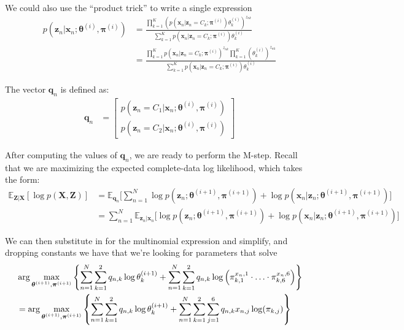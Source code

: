 \documentclass[12pt,letterpaper]{article}
\begin{document}
We could also use the ``product trick'' to write a single expression
%
\begin{align*}
  p(\textbf{z}_n  | \textbf{x}_n; \boldsymbol{\theta}^{(i)}, \boldsymbol{\pi}^{(i)})& =
 \frac{  \prod_{k=1}^K\left(  p(\textbf{x}_n | \textbf{z}_n = C_k; \boldsymbol{\pi}^{(i)})\theta_k^{(i)}\right) ^{z_{nk}}}
{\sum_{k=1}^K  p(\textbf{x}_n | \textbf{z}_n = C_k; \boldsymbol{\pi}^{(i)})\theta_k^{(i)}}
  \\
  & =
 \frac{  \prod_{k=1}^K p(\textbf{x}_n | \textbf{z}_n = C_k; \boldsymbol{\pi}^{(i)})^{z_{nk}}\prod_{k=1}^K(\theta_k^{(i)})^{z_{nk}}}
{\sum_{k=1}^K  p(\textbf{x}_n | \textbf{z}_n = C_k; \boldsymbol{\pi}^{(i)})\theta_k^{(i)}}
  \end{align*}

The vector $\textbf{q}_n$  is defined as:
%
\begin{align}
  \label{E-for-multinomial}
    \textbf{q}_n &= \begin{bmatrix}
                p(\textbf{z}_n = C_1 | \textbf{x}_n; \boldsymbol{\theta}^{(i)}, \boldsymbol{\pi}^{(i)}) \\
                p(\textbf{z}_n = C_2 | \textbf{x}_n; \boldsymbol{\theta}^{(i)}, \boldsymbol{\pi}^{(i)}) 
            \end{bmatrix} 
\end{align}


After computing the values of $\textbf{q}_n$, we are ready to perform the M-step.
Recall that we are maximizing the expected complete-data log likelihood, which takes the form:
%
\begin{align} \label{M-for-multinomial}
    \mathbb{E}_{\textbf{Z}|\textbf{X}}[\log p(\textbf{X}, \textbf{Z})] &= \mathbb{E}_{\textbf{q}_n} \bigg[\sum_{n=1}^{N} \log p(\textbf{z}_n; \boldsymbol{\theta}^{(i+1)}, \boldsymbol{\pi}^{(i+1)}) + \log p(\textbf{x}_n | \textbf{z}_n; \boldsymbol{\theta}^{(i+1)}, \boldsymbol{\pi}^{(i+1)})\bigg] \\ 
                                                                       &= \sum_{n=1}^{N} \mathbb{E}_{\textbf{z}_n|\textbf{x}_n} \bigg[ \log p(\textbf{z}_n; \boldsymbol{\theta}^{(i+1)}, \boldsymbol{\pi}^{(i+1)}) + \log p(\textbf{x}_n | \textbf{z}_n; \boldsymbol{\theta}^{(i+1)}, \boldsymbol{\pi}^{(i+1)})\bigg]
\end{align}

We can then substitute in for the multinomial expression and simplify,
and dropping constants we have that we're looking for
parameters that solve
%
\begin{align}
&  \arg\max_{\boldsymbol{\theta}^{(i+1)}, \boldsymbol{\pi}^{(i+1)}}\left\{
                \sum_{n=1}^{N} \sum_{k=1}^{2} q_{n, k}  \log \theta_k^{(i+1)} +
  \sum_{n=1}^{N} \sum_{k=1}^{2}q_{n,k}\log\left(\pi_{k,1}^{x_n,1}\cdot\ldots\cdot\pi_{k,6}^{x_n,6}\right) \right\}
 \notag \\
  &=  \arg\max_{\boldsymbol{\theta}^{(i+1)}, \boldsymbol{\pi}^{(i+1)}}\left\{
                \sum_{n=1}^{N} \sum_{k=1}^{2} q_{n, k}  \log \theta_k^{(i+1)} +
    \sum_{n=1}^{N} \sum_{k=1}^{2}\sum_{j=1}^6 q_{n,k}x_{n,j}\log(\pi_{k,j})\right\}
    \label{eq:dpnew1}
\end{align}
\end{document}
